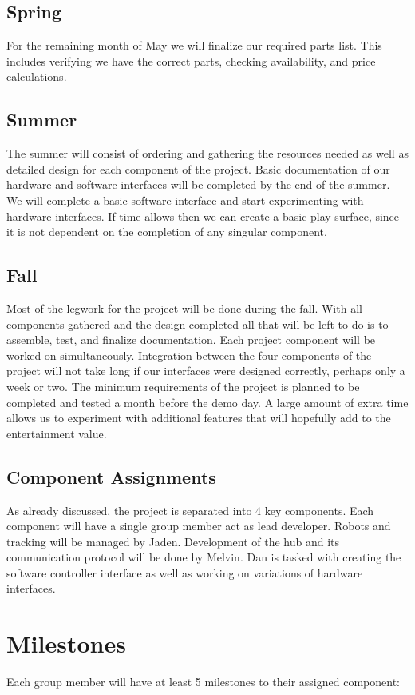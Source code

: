 \documentclass[11pt]{ieeeconf}
\begin{document}
\subsection{Spring}
For the remaining month of May we will finalize our required parts list. This includes verifying we have the correct parts, checking availability, and price calculations.

\subsection{Summer}
The summer will consist of ordering and gathering the resources needed as well as detailed design for each component of the project. Basic documentation of our hardware and software interfaces will be completed by the end of the summer. We will complete a basic software interface and start experimenting with hardware interfaces. If time allows then we can create a basic play surface, since it is not dependent on the completion of any singular component.

\subsection{Fall}
Most of the legwork for the project will be done during the fall. With all components gathered and the design completed all that will be left to do is to assemble, test, and finalize documentation. Each project component will be worked on simultaneously. Integration between the four components of the project will not take long if our interfaces were designed correctly, perhaps only a week or two. The minimum requirements of the project is planned to be completed and tested a month before the demo day. A large amount of extra time allows us to experiment with additional features that will hopefully add to the entertainment value.

\subsection{Component Assignments}
As already discussed, the project is separated into 4 key components. Each component will have a single group member act as lead developer. Robots and tracking will be managed by Jaden. Development of the hub and its communication protocol will be done by Melvin. Dan is tasked with creating the software controller interface as well as working on variations of hardware interfaces. 


\section{Milestones}
Each group member will have at least 5 milestones to their assigned component: 
\end{document}
